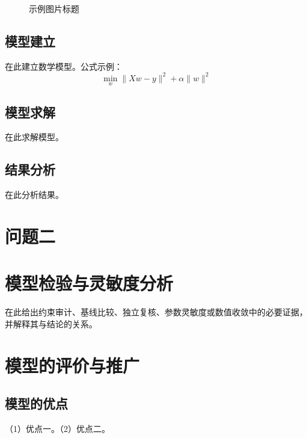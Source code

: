 \documentclass[12pt,a4paper]{article}
\begin{document}
\begin{figure}[htbp]\centering
  \caption{示例图片标题}
  \label{fig:example}
\end{figure}

\subsection{模型建立}

在此建立数学模型。公式示例：
\begin{equation}
  \min_w \|Xw - y\|^2 + \alpha\|w\|^2
\end{equation}

\subsection{模型求解}

在此求解模型。

\subsection{结果分析}

在此分析结果。

\section{问题二}


\section{模型检验与灵敏度分析}

在此给出约束审计、基线比较、独立复核、参数灵敏度或数值收敛中的必要证据，并解释其与结论的关系。

\section{模型的评价与推广}

\subsection{模型的优点}

（1）优点一。（2）优点二。
\end{document}
